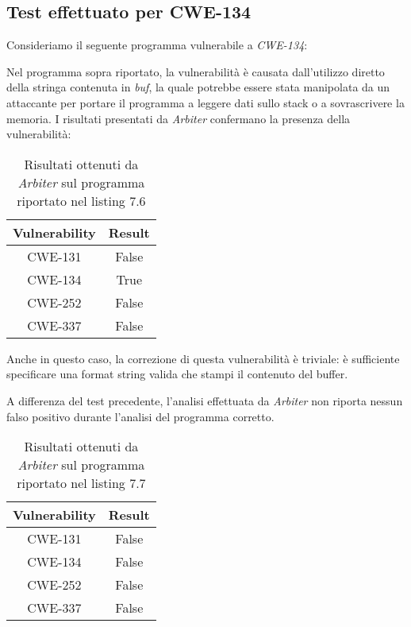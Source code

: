 \documentclass[../main.tex]{subfiles}
\begin{document}
\subsection{Test effettuato per CWE-134}
Consideriamo il seguente programma vulnerabile a \textit{CWE-134}:

Nel programma sopra riportato, la vulnerabilità è causata dall'utilizzo diretto della stringa contenuta in \textit{buf}, la quale potrebbe essere stata
manipolata da un attaccante per portare il programma a leggere dati sullo stack o a sovrascrivere la memoria. I risultati presentati da \textit{Arbiter} confermano
la presenza della vulnerabilità:
\begin{table}[H]
    \centering
    \begin{tabular}{|c|c|}
    \hline
    Vulnerability & Result \\ \hline
    CWE-131       & False   \\ \hline
    CWE-134       & True  \\ \hline
    CWE-252       & False  \\ \hline
    CWE-337       & False  \\ \hline
    \end{tabular}
    \caption{Risultati ottenuti da \textit{Arbiter} sul programma riportato nel listing 7.6}
\end{table}
\noindent
Anche in questo caso, la correzione di questa vulnerabilità è triviale: è sufficiente specificare una format string valida che stampi il contenuto del buffer.

A differenza del test precedente, l'analisi effettuata da \textit{Arbiter} non riporta nessun falso positivo durante l'analisi del programma corretto.
\begin{table}[H]
    \centering
    \begin{tabular}{|c|c|}
    \hline
    Vulnerability & Result \\ \hline
    CWE-131       & False   \\ \hline
    CWE-134       & False  \\ \hline
    CWE-252       & False  \\ \hline
    CWE-337       & False  \\ \hline
    \end{tabular}
    \caption{Risultati ottenuti da \textit{Arbiter} sul programma riportato nel listing 7.7}
\end{table}
\end{document}
